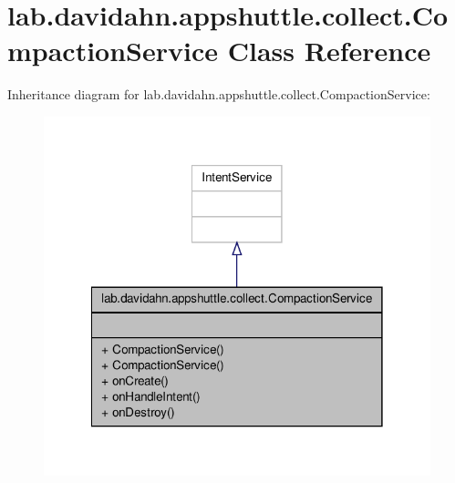 \hypertarget{classlab_1_1davidahn_1_1appshuttle_1_1collect_1_1_compaction_service}{\section{lab.\-davidahn.\-appshuttle.\-collect.\-Compaction\-Service \-Class \-Reference}
\label{classlab_1_1davidahn_1_1appshuttle_1_1collect_1_1_compaction_service}
}


\-Inheritance diagram for lab.\-davidahn.\-appshuttle.\-collect.\-Compaction\-Service\-:
\nopagebreak
\begin{figure}[H]
\begin{center}
\leavevmode
\includegraphics[width=318pt]{classlab_1_1davidahn_1_1appshuttle_1_1collect_1_1_compaction_service__inherit__graph}
\end{center}
\end{figure}


